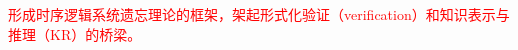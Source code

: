 \documentclass[aspectratio=1610, 9pt, CJK]{beamer}
\begin{document}
\begin{frame}
{%
\textcolor{red}{形成时序逻辑系统遗忘理论的框架，架起形式化验证（verification）和知识表示与推理（KR）的桥梁。}}
	\end{frame}
	
\end{document}
